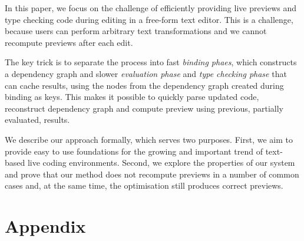 \documentclass[sigplan,10pt,review,anonymous]{acmart}\settopmatter{printfolios=true,printccs=false,printacmref=false}
\theoremstyle{plain}
\theoremstyle{definition}
\begin{document}
In this paper, we focus on the challenge of efficiently providing live previews and type checking 
code during editing in a free-form text editor. This is a challenge, because users can perform 
arbitrary text transformations and we cannot recompute previews after each edit.

The key trick is to separate the process into fast \emph{binding phaes}, 
which constructs a dependency graph and slower \emph{evaluation phase} and \emph{type checking phase} 
that can cache results, using the nodes from the dependency graph created during binding as keys.
This makes it possible to quickly parse updated code, reconstruct dependency graph and compute
preview using previous, partially evaluated, results.

We describe our approach formally, which serves two purposes. First, we aim to provide easy to
use foundations for the growing and important trend of text-based live coding environments. 
Second, we explore the properties of our system and prove that our method does not recompute 
previews in a number of common cases and, at the same time, the optimisation still produces 
correct previews.



\appendix 

\section{Appendix}
\label{sec:app-correctness}
\end{document}
